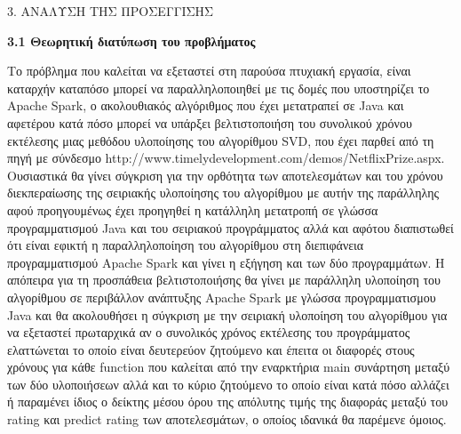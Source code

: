 \documentclass{report}
\begin{document}
\newpage

\begin{center}
\LARGE{3. ΑΝΑΛΥΣΗ ΤΗΣ ΠΡΟΣΕΓΓΙΣΗΣ}
\end{center}

\vspace{5mm}

\textbf{\large{3.1 Θεωρητική διατύπωση του προβλήματος}}
 
\vspace{2mm}

Το πρόβλημα που καλείται να εξεταστεί στη παρούσα πτυχιακή εργασία, είναι καταρχήν καταπόσο μπορεί να παραλληλοποιηθεί με τις δομές που υποστηρίζει το \textlatin{Apache Spark}, ο ακολουθιακός αλγόριθμος που έχει μετατραπεί σε \textlatin{Java} και αφετέρου κατά πόσο μπορεί να υπάρξει βελτιστοποιήση του συνολικού χρόνου εκτέλεσης μιας μεθόδου υλοποίησης του αλγορίθμου \textlatin{SVD}, που έχει παρθεί από τη πηγή με σύνδεσμο \textlatin{http://www.timelydevelopment.com/demos/NetflixPrize.aspx}. Ουσιαστικά θα γίνει σύγκριση για την ορθότητα των αποτελεσμάτων και του χρόνου διεκπεραίωσης της σειριακής υλοποίησης του αλγορίθμου με αυτήν της παράλληλης αφού προηγουμένως έχει προηγηθεί η κατάλληλη μετατροπή  σε γλώσσα προγραμματισμού \textlatin{Java} και του σειριακού προγράμματος αλλά και αφότου διαπιστωθεί ότι είναι εφικτή η παραλληλοποίηση του αλγορίθμου στη διεπιφάνεια προγραμματισμού \textlatin{Apache Spark} και γίνει η εξήγηση και των δύο προγραμμάτων. Η απόπειρα για τη προσπάθεια βελτιστοποιήσης θα γίνει με παράλληλη υλοποίηση του αλγορίθμου σε περιβάλλον ανάπτυξης \textlatin{Apache Spark} με γλώσσα προγραμματισμου \textlatin{Java} και θα ακολουθήσει η σύγκριση με την σειριακή υλοποίηση του αλγορίθμου  για να εξεταστεί πρωταρχικά αν ο συνολικός χρόνος εκτέλεσης του προγράμματος ελαττώνεται το οποίο είναι δευτερεύον ζητούμενο και έπειτα οι διαφορές στους χρόνους για κάθε \textlatin{function} που καλείται από την εναρκτήρια \textlatin{main} συνάρτηση  μεταξύ των δύο υλοποιήσεων αλλά και το κύριο ζητούμενο το οποίο είναι κατά πόσο αλλάζει ή  παραμένει ίδιος ο δείκτης μέσου όρου της απόλυτης τιμής της διαφοράς μεταξύ του \textlatin{rating} και \textlatin{predict rating}  των αποτελεσμάτων, ο οποίος ιδανικά θα παρέμενε όμοιος.  
\vspace{25mm} 
\end{document}
